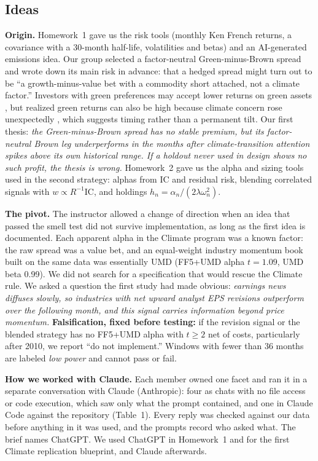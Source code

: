 \documentclass[11pt]{article}
\begin{document}
\subsection{Ideas}
\label{sec:ideas}

\textbf{Origin.} Homework~1 gave us the risk tools (monthly Ken French returns, a covariance with a 30-month half-life, volatilities and betas) and an AI-generated emissions idea. Our group selected a factor-neutral Green-minus-Brown spread and wrote down its main risk in advance: that a hedged spread might turn out to be ``a growth-minus-value bet with a commodity short attached, not a climate factor.'' Investors with green preferences may accept lower returns on green assets \citep{bk}, but realized green returns can also be high because climate concern rose unexpectedly \citep{pst2021,pst2022}, which suggests timing rather than a permanent tilt. Our first thesis: \emph{the Green-minus-Brown spread has no stable premium, but its factor-neutral Brown leg underperforms in the months after climate-transition attention spikes above its own historical range. If a holdout never used in design shows no such profit, the thesis is wrong.} Homework~2 gave us the alpha and sizing tools used in the second strategy: alphas from IC and residual risk, blending correlated signals with $w\propto R^{-1}\mathrm{IC}$, and holdings $h_n=\alpha_n/(2\lambda\omega_n^2)$.

\textbf{The pivot.} The instructor allowed a change of direction when an idea that passed the smell test did not survive implementation, as long as the first idea is documented. Each apparent alpha in the Climate program was a known factor: the raw spread was a value bet, and an equal-weight industry momentum book built on the same data was essentially UMD (FF5+UMD alpha $t=1.09$, UMD beta 0.99). We did not search for a specification that would rescue the Climate rule. We asked a question the first study had made obvious: \emph{earnings news diffuses slowly, so industries with net upward analyst EPS revisions outperform over the following month, and this signal carries information beyond price momentum.} \textbf{Falsification, fixed before testing:} if the revision signal or the blended strategy has no FF5+UMD alpha with $t\geq 2$ net of costs, particularly after 2010, we report ``do not implement.'' Windows with fewer than 36 months are labeled \emph{low power} and cannot pass or fail.

\textbf{How we worked with Claude.} Each member owned one facet and ran it in a separate conversation with Claude (Anthropic): four as chats with no file access or code execution, which saw only what the prompt contained, and one in Claude Code against the repository (Table~1). Every reply was checked against our data before anything in it was used, and the prompts record who asked what. The brief names ChatGPT. We used ChatGPT in Homework~1 and for the first Climate replication blueprint, and Claude afterwards.
\end{document}
